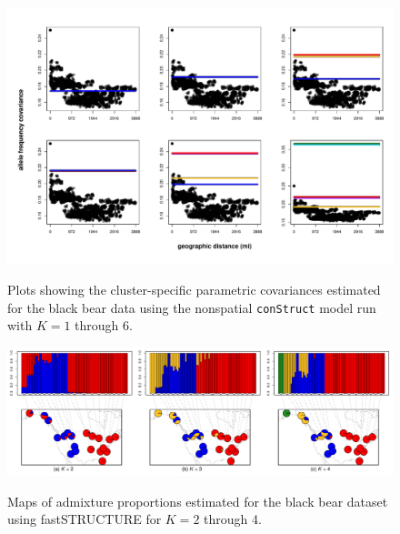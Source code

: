 \documentclass[10pt,letterpaper]{article}
\begin{document}
\begin{figure}
	\centering
		{\includegraphics[width=\textwidth]{figs/bears/bear_nsp_layer_covs.pdf}}
	\caption{
	Plots showing the cluster-specific parametric covariances 
	estimated for the black bear data using 
	the nonspatial \texttt{conStruct} model run with $K=1$ through 6.
    }\label{bear_nsp_layer_covs}
\end{figure}
\clearpage

\begin{figure}
	\centering
		{\includegraphics[width=\textwidth]{figs/bears/bear_fastStr_results.pdf}}
	\caption{
	Maps of admixture proportions estimated for the black bear dataset 
	using fastSTRUCTURE \cite{fastStructure} for $K=2$ through 4.
    }\label{bear_fastStr}
\end{figure}

\fi
\end{document}

